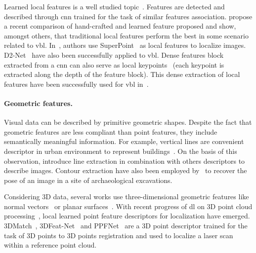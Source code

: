         Learned local features is a well studied topic~\citep{Carlevaris-Bianco2014,Paulin2015,Yi2016a,Ono2018a,Dusmanu2019,DeTone2017,Detone2018}. Features are detected and described through \ac{cnn} trained for the task of similar features association. \citet{Schonberger2017} propose a recent comparison of hand-crafted and learned feature proposed and show, amongst others, that traditional local features perform the best in some scenario related to \ac{vbl}. In~\cite{Sarlin2018a}, authors use SuperPoint~\citep{Detone2018} as local features to localize images. D2-Net~\citep{Dusmanu2019} have also been successfully applied to \ac{vbl}. Dense features block extracted from a \ac{cnn} can also serve as local keypoints~\citep{Widya2018} (each keypoint is extracted along the depth of the feature block). This dense extraction of local features have been successfully used for \ac{vbl} in~\citep{Piasco2019,Piasco2019a,Taira2018}.

		\paragraph{Geometric features.}
		 	Visual data can be described by primitive geometric shapes. Despite the fact that geometric features are less compliant than point features, they include semantically meaningful information. For example, vertical lines are convenient descriptor in urban environment to represent buildings~\citep{Arth2015,Morago2016,Ramalingam2011}. On the basis of this observation, \citet{Hays2008} introduce line extraction in combination with others descriptors to describe images.  Contour extraction have also been employed by~\citet{Russell2011} to recover the pose of an image in a site of archaeological excavations. 
		 	
		 	Considering 3D data, several works use three-dimensional geometric features like normal vectors~\citep{Li2016} or planar surfaces~\citep{Fernandez-Moral2013}. With recent progress of \ac{dl} on 3D point cloud processing~\citep{Qi2016a}, local learned point feature descriptors for localization have emerged. 3DMatch~\citep{Zeng2016}, 3DFeat-Net~\citep{Yew2018} and PPFNet~\citep{Deng2018} are a 3D point descriptor trained for the task of 3D points to 3D points registration and used to localize a laser scan within a reference point cloud.
			

